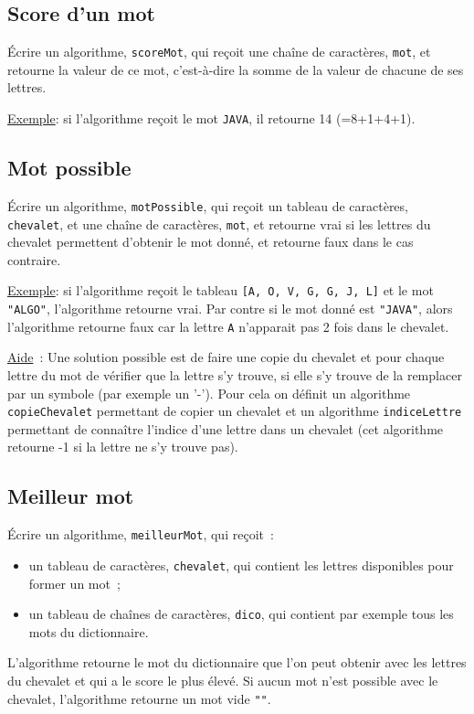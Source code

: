 		\subsection*{Score d’un mot}
			
			\'Ecrire un algorithme, \texttt{scoreMot}, 
			qui reçoit une chaîne de caractères, 
			\texttt{mot}, et retourne la valeur de ce mot, c’est-à-dire la somme de la valeur de chacune de ses lettres.
	
			\underline{Exemple}: si l’algorithme reçoit le mot \texttt{JAVA}, il retourne 14 (=8+1+4+1).
	
		\subsection*{Mot possible}
	
			\'Ecrire un algorithme, \texttt{motPossible}, qui reçoit un tableau de caractères, 
			\texttt{chevalet}, et une chaîne de caractères, 
			\texttt{mot}, et retourne vrai si les lettres du chevalet permettent d’obtenir le mot donné, et retourne faux dans le cas contraire. 
	
	
			\underline{Exemple}: si l’algorithme reçoit le tableau \texttt{[A, O, V, G, G, J, L]} 
			et le mot \texttt{"ALGO"}, l’algorithme retourne vrai. 
			Par contre si le mot donné est \texttt{"JAVA"}, 
			alors l’algorithme retourne faux car la lettre \texttt{A} n’apparait pas 2 fois dans le chevalet.
	
	
			\underline{Aide}~: Une solution possible est de faire une copie du chevalet 
			et pour chaque lettre du mot de vérifier que la lettre s’y trouve, 
			si elle s’y trouve de la remplacer par un symbole (par exemple un '-').
			Pour cela on définit un algorithme \texttt{copieChevalet} 
			permettant de copier un chevalet et un algorithme \texttt{indiceLettre} 
			permettant de connaître l’indice d’une lettre dans un chevalet 
			(cet algorithme retourne -1 si la lettre ne s’y trouve pas). 
	
		\subsection*{Meilleur mot}
	
			\'Ecrire un algorithme, \texttt{meilleurMot}, qui reçoit~:
			\begin{itemize}
			\item un tableau de caractères, \texttt{chevalet}, qui contient les lettres disponibles pour former un mot~;
			\item un tableau de chaînes de caractères, \texttt{dico}, qui contient par exemple tous les mots du dictionnaire.
			\end{itemize}
			L’algorithme retourne le mot du dictionnaire que l’on peut obtenir avec les lettres du chevalet 
			et qui a le score le plus élevé. 
			Si aucun mot n’est possible avec le chevalet, l’algorithme retourne un mot vide \texttt{""}.
	
